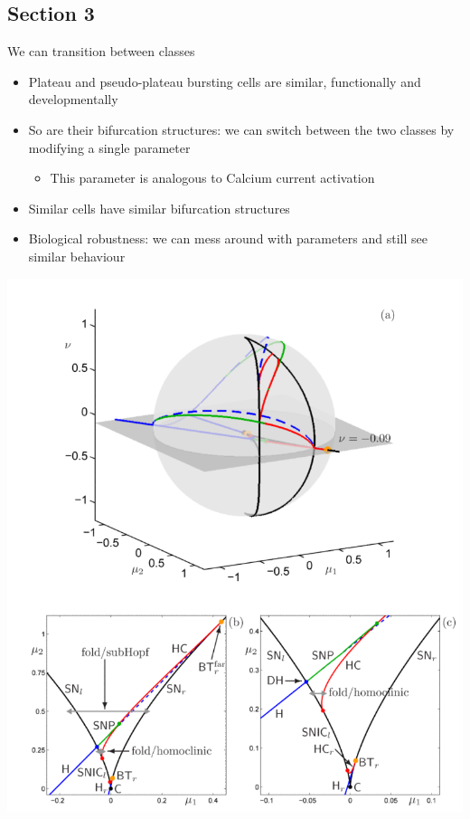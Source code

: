 \documentclass[presentation]{beamer}
\begin{document}
\subsection{Section 3}
\label{sec:org0750a08}
\begin{frame}[label={sec:org49e4f05}]{We can transition between classes}
\begin{itemize}[<+->]
\item Plateau and pseudo-plateau bursting cells are similar, functionally and developmentally
\item So are their bifurcation structures: we can switch between the two classes by modifying a single parameter
\begin{itemize}
\item This parameter is analogous to Calcium current activation
\end{itemize}
\item Similar cells have similar bifurcation structures
\item Biological robustness: we can mess around with parameters and still see similar behaviour
\end{itemize}
\end{frame}

\begin{frame}[plain,label={sec:org6cc4461}]{}
\begin{center}
\includegraphics[height=1.4\textheight]{./3d.png}
\end{center}
\end{frame}
\end{document}
